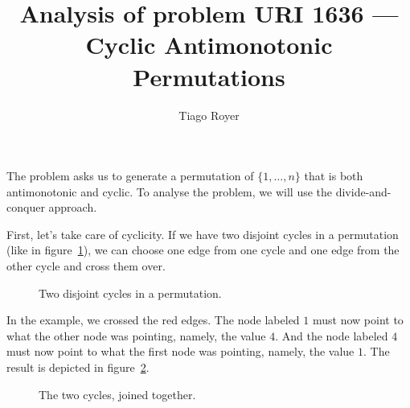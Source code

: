 \documentclass{article}
\begin{document}
\title{Analysis of problem URI 1636 --- Cyclic Antimonotonic Permutations}
\date{}
\author{Tiago Royer}
\maketitle

The problem asks us to generate a permutation of $\{1, \dots, n\}$
that is both antimonotonic and cyclic.
To analyse the problem, we will use the divide-and-conquer approach.

First, let's take care of cyclicity.
If we have two disjoint cycles in a permutation
(like in figure~\ref{fig1}),
we can choose one edge from one cycle
and one edge from the other cycle and cross them over.

\begin{figure}[h]
    \centering
    \caption{Two disjoint cycles in a permutation.}
    \label{fig1}
\end{figure}

In the example, we crossed the red edges.
The node labeled $1$ must now point to what the other node was pointing,
namely, the value $4$.
And the node labeled $4$ must now point to what the first node was pointing,
namely, the value $1$.
The result is depicted in figure~\ref{fig2}.

\begin{figure}[h]
    \centering
    \caption{The two cycles, joined together.}
    \label{fig2}
\end{figure}
\end{document}
